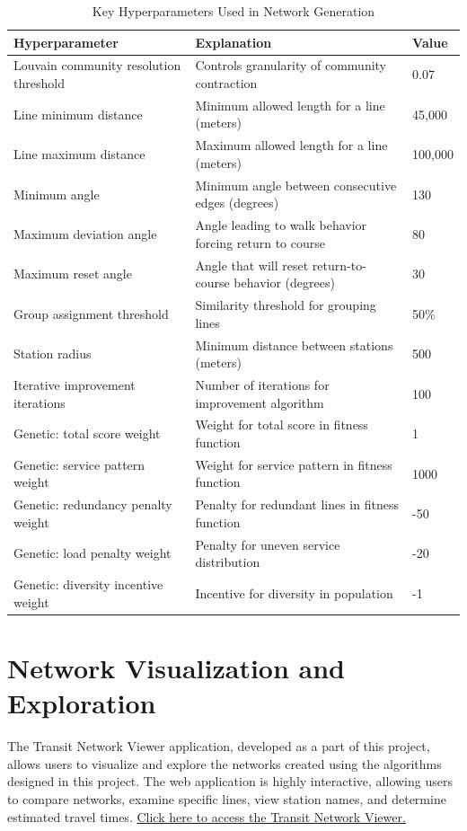 \documentclass[sigconf,nonacm]{acmart}
\begin{document}
\begin{table}[h]
\caption{Key Hyperparameters Used in Network Generation}
\label{tab:hyperparams}
\begin{tabular}{lll}
\toprule
\textbf{Hyperparameter} & \textbf{Explanation} & \textbf{Value} \\
\midrule
Louvain community resolution threshold & Controls granularity of community contraction & 0.07 \\
Line minimum distance & Minimum allowed length for a line (meters) & 45,000 \\
Line maximum distance & Maximum allowed length for a line (meters) & 100,000 \\
Minimum angle & Minimum angle between consecutive edges (degrees) & 130 \\
Maximum deviation angle & Angle leading to walk behavior forcing return to course & 80 \\
Maximum reset angle & Angle that will reset return-to-course behavior (degrees) & 30 \\
Group assignment threshold & Similarity threshold for grouping lines & 50\% \\
Station radius & Minimum distance between stations (meters) & 500 \\
Iterative improvement iterations & Number of iterations for improvement algorithm & 100 \\
Genetic: total score weight & Weight for total score in fitness function & 1 \\
Genetic: service pattern weight & Weight for service pattern in fitness function & 1000 \\
Genetic: redundancy penalty weight & Penalty for redundant lines in fitness function & -50 \\
Genetic: load penalty weight & Penalty for uneven service distribution & -20 \\
Genetic: diversity incentive weight & Incentive for diversity in population & -1 \\
\bottomrule
\end{tabular}
\end{table}


\section{Network Visualization and Exploration}

The Transit Network Viewer application, developed as a part of this project, allows users to visualize and explore the networks created using the algorithms designed in this project. The web application is highly interactive, allowing users to compare networks, examine specific lines, view station names, and determine estimated travel times. \href{https://spencerrjenkins.github.io/cmsc725_wmata_map/app}{Click here to access the Transit Network Viewer.}
\end{document}
